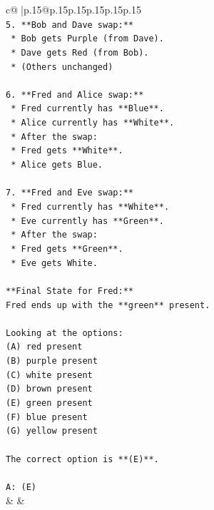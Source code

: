 \documentclass{article}
\begin{document}
{\begin{supertabular}{c@{$\;$}|p{.15\linewidth}@{}p{.15\linewidth}p{.15\linewidth}p{.15\linewidth}p{.15\linewidth}p{.15\linewidth}}
{{{\\ 
\texttt{5.  **Bob and Dave swap:**} \\
\texttt{    *   Bob gets Purple (from Dave).} \\
\texttt{    *   Dave gets Red (from Bob).} \\
\texttt{    *   (Others unchanged)} \\
\\ 
\texttt{6.  **Fred and Alice swap:**} \\
\texttt{    *   Fred currently has **Blue**.} \\
\texttt{    *   Alice currently has **White**.} \\
\texttt{    *   After the swap:} \\
\texttt{        *   Fred gets **White**.} \\
\texttt{        *   Alice gets Blue.} \\
\\ 
\texttt{7.  **Fred and Eve swap:**} \\
\texttt{    *   Fred currently has **White**.} \\
\texttt{    *   Eve currently has **Green**.} \\
\texttt{    *   After the swap:} \\
\texttt{        *   Fred gets **Green**.} \\
\texttt{        *   Eve gets White.} \\
\\ 
\texttt{**Final State for Fred:**} \\
\texttt{Fred ends up with the **green** present.} \\
\\ 
\texttt{Looking at the options:} \\
\texttt{(A) red present} \\
\texttt{(B) purple present} \\
\texttt{(C) white present} \\
\texttt{(D) brown present} \\
\texttt{(E) green present} \\
\texttt{(F) blue present} \\
\texttt{(G) yellow present} \\
\\ 
\texttt{The correct option is **(E)**.} \\
\\ 
\texttt{A: (E)} \\
            }
        }
    }
    & & \\ \\


\end{supertabular}}
\end{document}
